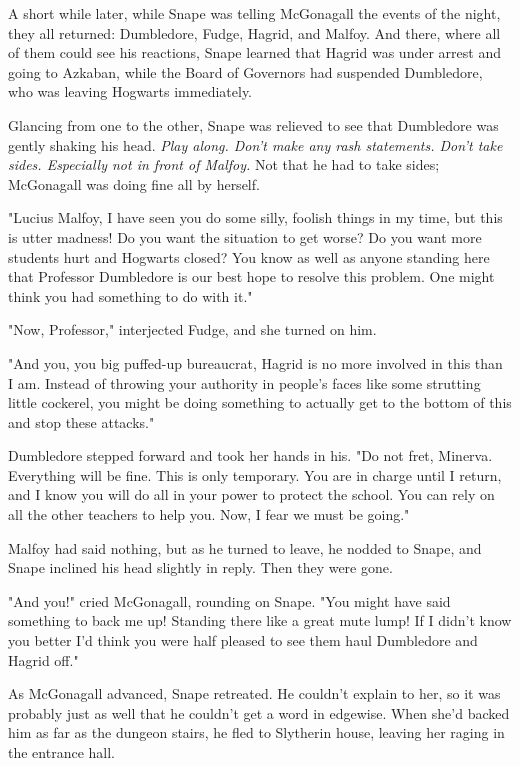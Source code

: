 \documentclass[a4paper,11pt]{article}
\begin{document}
A short while later, while Snape was telling McGonagall the events of the night, they all returned: Dumbledore, Fudge, Hagrid, and Malfoy. And there, where all of them could see his reactions, Snape learned that Hagrid was under arrest and going to Azkaban, while the Board of Governors had suspended Dumbledore, who was leaving Hogwarts immediately.

Glancing from one to the other, Snape was relieved to see that Dumbledore was gently shaking his head. \emph{Play along. Don't make any rash statements. Don't take sides. Especially not in front of Malfoy.} Not that he had to take sides; McGonagall was doing fine all by herself.

"Lucius Malfoy, I have seen you do some silly, foolish things in my time, but this is utter madness! Do you want the situation to get worse? Do you want more students hurt and Hogwarts closed? You know as well as anyone standing here that Professor Dumbledore is our best hope to resolve this problem. One might think you had something to do with it."

"Now, Professor," interjected Fudge, and she turned on him.

"And you, you big puffed-up bureaucrat, Hagrid is no more involved in this than I am. Instead of throwing your authority in people's faces like some strutting little cockerel, you might be doing something to actually get to the bottom of this and stop these attacks."

Dumbledore stepped forward and took her hands in his. "Do not fret, Minerva. Everything will be fine. This is only temporary. You are in charge until I return, and I know you will do all in your power to protect the school. You can rely on all the other teachers to help you. Now, I fear we must be going."

Malfoy had said nothing, but as he turned to leave, he nodded to Snape, and Snape inclined his head slightly in reply. Then they were gone.

"And you!" cried McGonagall, rounding on Snape. "You might have said something to back me up! Standing there like a great mute lump! If I didn't know you better I'd think you were half pleased to see them haul Dumbledore and Hagrid off."

As McGonagall advanced, Snape retreated. He couldn't explain to her, so it was probably just as well that he couldn't get a word in edgewise. When she'd backed him as far as the dungeon stairs, he fled to Slytherin house, leaving her raging in the entrance hall.
\end{document}
